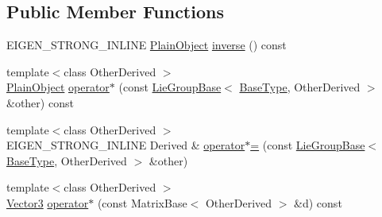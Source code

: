 \subsection*{Public Member Functions}
\begin{DoxyCompactItemize}
\item 
E\+I\+G\+E\+N\+\_\+\+S\+T\+R\+O\+N\+G\+\_\+\+I\+N\+L\+I\+NE \hyperlink{class_lie_group_base_3_01_array_3_01typename_01internal_1_1traits_3_01_derived_01_4_1_1_scalar_0d6d4b5459662fc32c7117aee50362fb1_a950a48c9e027bcd00193aa20a59ee723}{Plain\+Object} \hyperlink{class_lie_group_base_3_01_array_3_01typename_01internal_1_1traits_3_01_derived_01_4_1_1_scalar_0d6d4b5459662fc32c7117aee50362fb1_a05e8da8cba6d186d3f4e146d282eb020}{inverse} () const
\item 
{\footnotesize template$<$class Other\+Derived $>$ }\\\hyperlink{class_lie_group_base_3_01_array_3_01typename_01internal_1_1traits_3_01_derived_01_4_1_1_scalar_0d6d4b5459662fc32c7117aee50362fb1_a950a48c9e027bcd00193aa20a59ee723}{Plain\+Object} \hyperlink{class_lie_group_base_3_01_array_3_01typename_01internal_1_1traits_3_01_derived_01_4_1_1_scalar_0d6d4b5459662fc32c7117aee50362fb1_a25cfdbb6cf3577ed877d4d2f0c25bcd5}{operator$\ast$} (const \hyperlink{class_lie_group_base}{Lie\+Group\+Base}$<$ \hyperlink{class_lie_group_base_3_01_array_3_01typename_01internal_1_1traits_3_01_derived_01_4_1_1_scalar_0d6d4b5459662fc32c7117aee50362fb1_aadee14149cfa071338ac1f64e23c283d}{Base\+Type}, Other\+Derived $>$ \&other) const
\item 
{\footnotesize template$<$class Other\+Derived $>$ }\\E\+I\+G\+E\+N\+\_\+\+S\+T\+R\+O\+N\+G\+\_\+\+I\+N\+L\+I\+NE Derived \& \hyperlink{class_lie_group_base_3_01_array_3_01typename_01internal_1_1traits_3_01_derived_01_4_1_1_scalar_0d6d4b5459662fc32c7117aee50362fb1_a374b22e97d35645a2b38c9f37d926633}{operator$\ast$=} (const \hyperlink{class_lie_group_base}{Lie\+Group\+Base}$<$ \hyperlink{class_lie_group_base_3_01_array_3_01typename_01internal_1_1traits_3_01_derived_01_4_1_1_scalar_0d6d4b5459662fc32c7117aee50362fb1_aadee14149cfa071338ac1f64e23c283d}{Base\+Type}, Other\+Derived $>$ \&other)
\item 
{\footnotesize template$<$class Other\+Derived $>$ }\\\hyperlink{class_lie_group_base_3_01_array_3_01typename_01internal_1_1traits_3_01_derived_01_4_1_1_scalar_0d6d4b5459662fc32c7117aee50362fb1_acf35a22e3543ed4824de3c19c965961c}{Vector3} \hyperlink{class_lie_group_base_3_01_array_3_01typename_01internal_1_1traits_3_01_derived_01_4_1_1_scalar_0d6d4b5459662fc32c7117aee50362fb1_a4c0458408f7b6df1bc6ca8a5d0704983}{operator$\ast$} (const Matrix\+Base$<$ Other\+Derived $>$ \&d) const

\end{DoxyCompactItemize}
